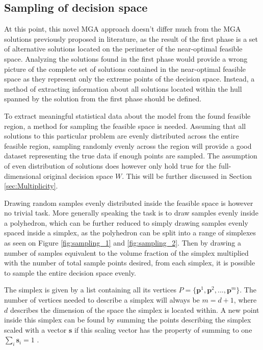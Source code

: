 \subsection{Sampling of decision space}

At this point, this novel MGA approach doesn't differ much from the MGA solutions previously proposed in literature, as the result of the first phase is a set of alternative solutions located on the perimeter of the near-optimal feasible space. Analyzing the solutions found in the first phase would provide a wrong picture of the complete set of solutions contained in the near-optimal feasible space as they represent only the extreme points of the decision space. Instead, a method of extracting information about all solutions located within the hull spanned by the solution from the first phase should be defined. 

To extract meaningful statistical data about the model from the found feasible region, a method for sampling the feasible space is needed. Assuming that all solutions to this particular problem are evenly distributed across the entire feasible region, sampling randomly evenly across the region will provide a good dataset representing the true data if enough points are sampled. The assumption of even distribution of solutions does however only hold true for the full-dimensional original decision space $W$. This will be further discussed in Section \ref{sec:Multiplicity}. 

Drawing random samples evenly distributed inside the feasible space is however no trivial task. More generally speaking the task is to draw samples evenly inside a polyhedron, which can be further reduced to simply drawing samples evenly spaced inside a simplex, as the polyhedron can be split into a range of simplexes as seen on Figure \ref{fig:sampling_1} and \ref{fig:sampling_2}. Then by drawing a number of samples equivalent to the volume fraction of the simplex multiplied with the number of total sample points desired, from each simplex, it is possible to sample the entire decision space evenly. 

The simplex is given by a list containing all its vertices $P = \{\mathbf{p}^1,\mathbf{p}^2,...,\mathbf{p}^m\}$. The number of vertices needed to describe a simplex will always be $m = d+1$, where $d$ describes the dimension of the space the simplex is located within. 
A new point inside this simplex can be found by summing the points describing the simplex scaled with a vector $\mathbf{s}$ if this scaling vector has the property of summing to one $\sum_i \mathbf{s}_i = 1$ . 

